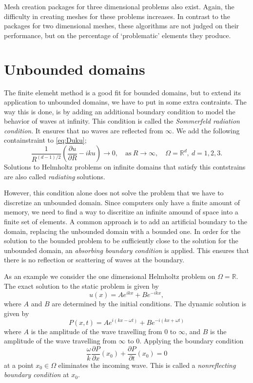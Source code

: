 \documentclass[a4paper]{article}
\newcommand{\Reals}{\mathbb{R}}
\begin{document}
Mesh creation packages for three dimensional problems also exist.
Again, the difficulty in creating meshes for these problems increases.
In contrast to the packages for two dimensional meshes, these
algorithms are not judged on their performance, but on the percentage
of `problematic' elements they produce.

\section{Unbounded domains}

The finite elemeht method is a good fit for bounded domains, but to
extend its application to unbounded domains, we have to put in some
extra contraints. The way this is done, is by adding an
additional boundary condition to model the behavior of waves at
infinity. This condition is called the \emph{Sommerfeld radiation
condition}. It ensures that no waves are reflected from $\infty$. We
add the following containstraint to \eqref{eq:Duku};
\begin{equation}
  \frac{1}{R^{(d - 1)/2}}
  \left( \frac{\partial u}{\partial R} - i k u \right)
  \rightarrow 0, \quad
  \text{as}\ R \rightarrow \infty, \quad \Omega = \Reals^d,\ d = 1, 2, 3.
\end{equation}
Solutions to Helmholtz problems on infinite domains that satisfy this
contstrains are also called \emph{radiating} solutions.

However, this condition alone does not solve the problem that we have
to discretize an unbounded domain. Since computers only have a finite
amount of memory, we need to find a way to discritize an infinite
amound of space into a finite set of elements. A common approach is to
add an artificial boundary to the domain, replacing the unbounded
domain with a bounded one. In order for the solution to the bounded
problem to be sufficiently close to the solution for the unbounded
domain, an \emph{absorbing boundary condition} is applied. This
ensures that there is no reflection or scattering of waves at the
boundary.

As an example we consider the one dimensional Helmholtz problem on
$\Omega = \Reals$. The exact solution to the static problem is given
by
\begin{equation*}
  u(x) = A e^{i k x} + B e^{-i k x},
\end{equation*}
where $A$ and $B$ are determined by the initial conditions. The
dynamic solution is given by
\begin{equation*}
  P(x, t) = A e^{i(k x - \omega t)} + B e^{-i(k x + \omega t)}
\end{equation*}
where $A$ is the amplitude of the wave travelling from $0$ to
$\infty$, and $B$ is the amplitude of the wave travelling from
$\infty$ to $0$. Applying the boundary condition
\begin{equation*}
  \frac{\omega}{k} \frac{\partial P}{\partial x}(x_0)
  + \frac{\partial P}{\partial t}(x_0) = 0
\end{equation*}
at a point $x_0 \in \Omega$ eliminates the incoming wave. This is
called a \emph{nonreflecting boundary condition} at $x_0$.
\end{document}
